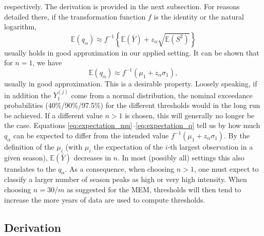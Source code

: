 \documentclass{article}
\newcommand{\mean}{\bar{Y}}
\begin{document}
respectively. The derivation is provided in the next subsection. For reasons detailed there, if the transformation function $f$ is the identity or the natural logarithm,
\begin{equation}
\mathbb{E}(q_\alpha) \approx f^{-1}\left\{\mathbb{E}(\mean) + z_\alpha \sqrt{\mathbb{E}(S^2)}\right\}
\label{eq:expectation_q}
\end{equation}
usually holds in good approximation in our applied setting. It can be shown that for $n = 1$, we have
$$
\mathbb{E}(q_\alpha) \approx f^{-1}(\mu_1 + z_\alpha \sigma_1),
$$
usually in good approximation. This is a desirable property. Loosely speaking, if in addition the $Y_{1}^{(j)}$ come from a normal distribution, the nominal exceedance probabilities (40\%/90\%/97.5\%) for the different thresholds would in the long run be achieved. If a different value $n > 1$ is chosen, this will generally no longer be the case. Equations \eqref{eq:expectation_mu}--\eqref{eq:expectation_q} tell us by how much $q_\alpha$ can be expected to differ from the intended value $f^{-1}(\mu_1 + z_\alpha \sigma_1)$. By the definition of the $\mu_i$ (with $\mu_i$ the expectation of the $i$-th largest observation in a given season), $\mathbb{E}(\mean)$ decreases in $n$. In most (possibly all) settings this also translates to the $q_\alpha$. As a consequence, when choosing $n > 1$, one must expect to classify a larger number of season peaks as high or very high intensity. When choosing $n = 30/m$ as suggested for the MEM, thresholds will then tend to increase the more years of data are used to compute thresholds.

\subsection{Derivation}
\end{document}
